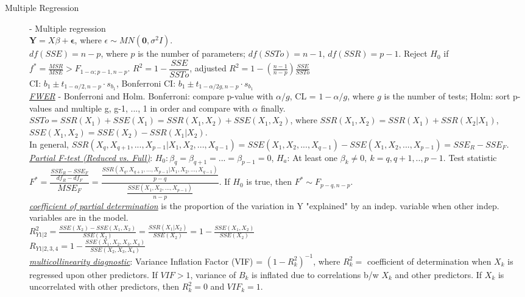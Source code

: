 \documentclass[10pt,landscape]{article}
\begin{document}
\begin{multicols}{3}
\begin{description}
    \end{description}
    
    \begin{description}
    		\item[Multiple Regression] - Multiple regression \\ %
    		$\boldsymbol{Y} = X\beta+\boldsymbol{\epsilon}$, where $\epsilon \sim MN(\boldsymbol{0}, \sigma^2I)$. \\    	
    		$df(SSE) = n-p$, where $p$ is the number of parameters; $df(SSTo) = n-1$, $df(SSR) = p-1$.  Reject $H_0$ if $f^* =  \frac{MSR}{MSE} > F_{1-\alpha; p-1, n-p}$. $R^2 = 1-\dfrac{SSE}{SSTo}$, adjusted $R^2 = 1 - (\frac{n-1}{n-p}) \frac{SSE}{SSTo}$\\
    		CI: $b_1 \pm t_{1-\alpha/2, n-p} \cdot s_{b_1}$, Bonferroni CI:  $b_1 \pm t_{1-\alpha/2g, n-p} \cdot s_{b_1}$\\	
		\underline{\textit{FWER}} - Bonferroni and Holm. Bonferroni: compare p-value with $\alpha / g$, CL = $1-\alpha / g$, where $g$ is the number of tests; Holm: sort p-values and multiple g, g-1, ..., 1 in order and compare with $\alpha$ finally. \\
		$SSTo = SSR(X_1) + SSE(X_1) = SSR(X_1, X_2) + SSE(X_1, X_2)$, where $SSR(X_1, X_2) = SSR(X_1) + SSR(X_2|X_1)$, $SSE(X_1,  X_2) = SSE(X_2) - SSR(X_1|X_2)$.\\
		In general,  $SSR(X_q, X_{q+1},..., X_{p-1}|X_1, X_2,...,X_{q-1}) = SSE(X_1, X_2,...,X_{q-1}) - SSE(X_1, X_2, ...,X_{p-1}) = SSE_R - SSE_F$.\\
		\underline{\textit{Partial F-test (Reduced vs. Full)}}: $H_0: \beta_q = \beta_{q+1} = ... = \beta_{p-1} = 0$, $H_a$: At least one $\beta_k \neq 0,\ k = q, q+1, .., p-1$. Test statistic $F^* = \dfrac{\frac{SSE_R - SSE_F}{df_R - df_F}}{MSE_F} = \dfrac{\frac{SSR(X_q, X_{q+1}, ..., X_{p-1} | X_1, X_2, ..., X_{q-1})}{p-q}}{\frac{SSE(X_1, X_2, ..., X_{p-1})}{n-p}} $. If $H_0$ is true, then $F^* \sim F_{p-q, n-p}$.\\
		\underline{\textit{coefficient of partial determination}} is the proportion of the variation in Y "explained" by an indep. variable when other indep. variables are in the model. \\
		$R_{Y1|2}^2 = \frac{SSE(X_2) - SSE(X_1, X_2)}{SSE(X_2)} = \frac{SSR(X_1|X_2)}{SSE(X_2)} = 1 - \frac{SSE(X_1, X_2)}{SSE(X_2)}$ \\
		$R_{Y1|2,3,4} = 1 - \frac{SSE(X_1, X_2, X_3, X_4)}{SSE(X_2, X_3, X_4)}$\\
		\underline{\textit{multicollinearity diagnostic}}: Variance Inflation Factor (VIF) = $(1 - R_k^2)^{-1}$, where $R_k^2=$ coefficient of determination when $X_k$ is regressed upon other predictors. If $VIF>1$, variance of $B_k$ is inflated due to correlations b/w $X_k$ and other predictors. 	If $X_k$ is uncorrelated with other predictors, then $R_k^2 = 0$ and $VIF_k = 1$. \\ 
		

\end{description}
\end{multicols}
\end{document}
